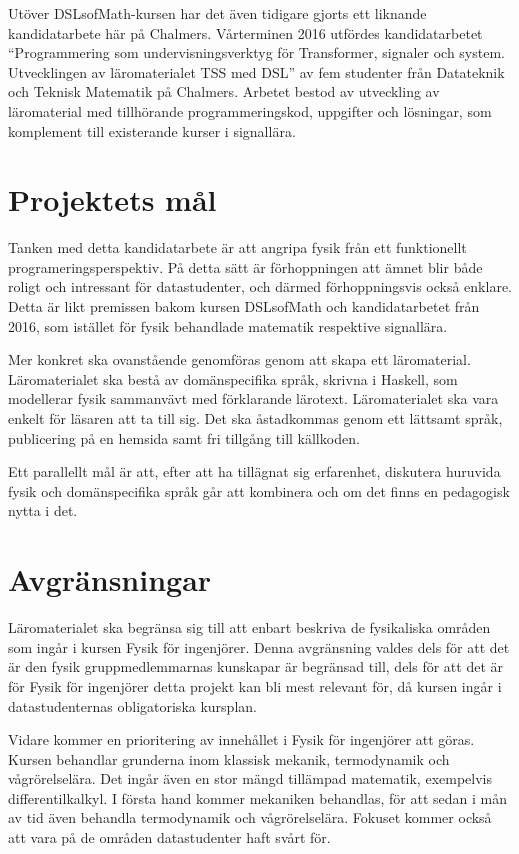 \begin{draft}
Utöver DSLsofMath-kursen har det även tidigare gjorts ett liknande kandidatarbete 
här på Chalmers. Vårterminen 2016 utfördes kandidatarbetet ``Programmering som
undervisningsverktyg för Transformer, signaler och system. Utvecklingen av
läromaterialet TSS med DSL'' av fem studenter från Datateknik och Teknisk
Matematik på Chalmers. Arbetet bestod av utveckling av läromaterial med
tillhörande programmeringskod, uppgifter och lösningar, som komplement till
existerande kurser i signallära.\cite{kandidat2016}

\section{Projektets mål}

Tanken med detta kandidatarbete är att angripa fysik från ett funktionellt
programeringsperspektiv. På detta sätt är förhoppningen att ämnet blir både
roligt och intressant för datastudenter, och därmed förhoppningsvis också
enklare. Detta är likt premissen bakom kursen DSLsofMath och kandidatarbetet
från 2016, som istället för fysik behandlade matematik respektive signallära.

Mer konkret ska ovanstående genomföras genom att skapa ett läromaterial.
Läromaterialet ska bestå av 
domänspecifika språk, skrivna
i Haskell, som
modellerar fysik sammanvävt med förklarande lärotext. Läromaterialet ska vara
enkelt för läsaren att ta till sig. Det ska åstadkommas genom ett lättsamt
språk, publicering på en hemsida samt fri tillgång till källkoden.

Ett parallellt mål är att, efter att ha tillägnat sig erfarenhet, diskutera
huruvida fysik och domänspecifika språk går att kombinera och om det finns en
pedagogisk nytta i det.

\section{Avgränsningar}\label{sec:avgransningar}

Läromaterialet ska begränsa sig till att enbart beskriva de fysikaliska områden
som ingår i kursen Fysik för ingenjörer. Denna avgränsning valdes dels för att
det är den fysik gruppmedlemmarnas kunskapar är begränsad till, dels för att
det är för Fysik för ingenjörer detta projekt kan bli mest relevant för, då
kursen ingår i datastudenternas obligatoriska kursplan.

Vidare kommer en prioritering av innehållet i Fysik för ingenjörer att göras.
Kursen behandlar grunderna inom klassisk mekanik, termodynamik och
vågrörelselära. Det ingår även en stor mängd tillämpad matematik, exempelvis
differentilkalkyl. I första hand kommer mekaniken behandlas, för att sedan i mån
av tid även behandla termodynamik och vågrörelselära. Fokuset kommer också att
vara på de områden datastudenter haft svårt för.


\end{draft}
